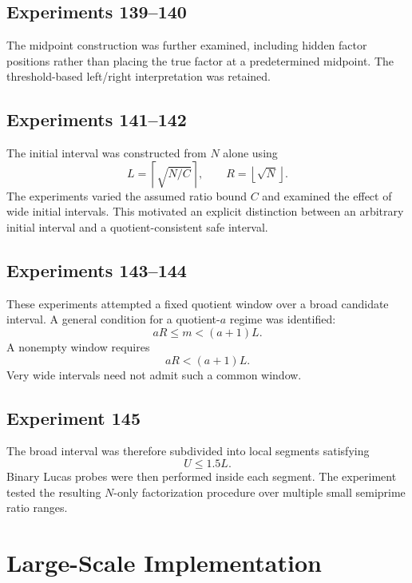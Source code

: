 \documentclass[11pt,a4paper]{article}
\begin{document}
\subsection{Experiments 139--140}

The midpoint construction was further examined, including hidden factor positions rather than placing the true factor at a predetermined midpoint. The threshold-based left/right interpretation was retained.

\subsection{Experiments 141--142}

The initial interval was constructed from $N$ alone using
\[
L=\left\lceil\sqrt{N/C}\right\rceil,
\qquad
R=\left\lfloor\sqrt N\right\rfloor.
\]
The experiments varied the assumed ratio bound $C$ and examined the effect of wide initial intervals. This motivated an explicit distinction between an arbitrary initial interval and a quotient-consistent safe interval.

\subsection{Experiments 143--144}

These experiments attempted a fixed quotient window over a broad candidate interval. A general condition for a quotient-$a$ regime was identified:
\begin{equation}
aR\le m<(a+1)L.
\label{eq:quotientwindow}
\end{equation}
A nonempty window requires
\begin{equation}
aR<(a+1)L.
\end{equation}
Very wide intervals need not admit such a common window.

\subsection{Experiment 145}

The broad interval was therefore subdivided into local segments satisfying
\[
U\le1.5L.
\]
Binary Lucas probes were then performed inside each segment. The experiment tested the resulting $N$-only factorization procedure over multiple small semiprime ratio ranges.

\section{Large-Scale Implementation}
\end{document}
